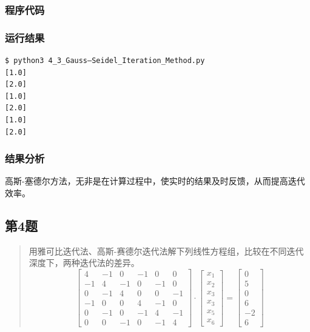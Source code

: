 \subsubsection{程序代码}



\subsubsection{运行结果}

\begin{lstlisting}[style = bash]
$ python3 4_3_Gauss–Seidel_Iteration_Method.py 
[1.0]
[2.0]
[1.0]
[2.0]
[1.0]
[2.0]
\end{lstlisting}

\subsubsection{结果分析}
高斯-塞德尔方法，无非是在计算过程中，使实时的结果及时反馈，从而提高迭代效率。

\subsection{第4题}
\begin{quote}
    用雅可比迭代法、高斯-赛德尔迭代法解下列线性方程组，比较在不同迭代深度下，两种迭代法的差异。
    \begin{equation}
    \left[ \begin{array}{rrrrrr}{4} & {-1} & {0} & {-1} & {0} & {0} \\ {-1} & {4} & {-1} & {0} & {-1} & {0} \\ {0} & {-1} & {4} & {0} & {0} & {-1} \\ {-1} & {0} & {0} & {4} & {-1} & {0} \\ {0} & {-1} & {0} & {-1} & {4} & {-1} \\ {0} & {0} & {-1} & {0} & {-1} & {4}\end{array}\right] \cdot \left[ \begin{array}{c}{x_{1}} \\ {x_{2}} \\ {x_{3}} \\ {x_{3}} \\ {x_{5}} \\ {x_{6}}\end{array}\right]=\left[ \begin{array}{r}{0} \\ {5} \\ {0} \\ {6} \\ {-2} \\ {6}\end{array}\right]
    \end{equation}
\end{quote}

